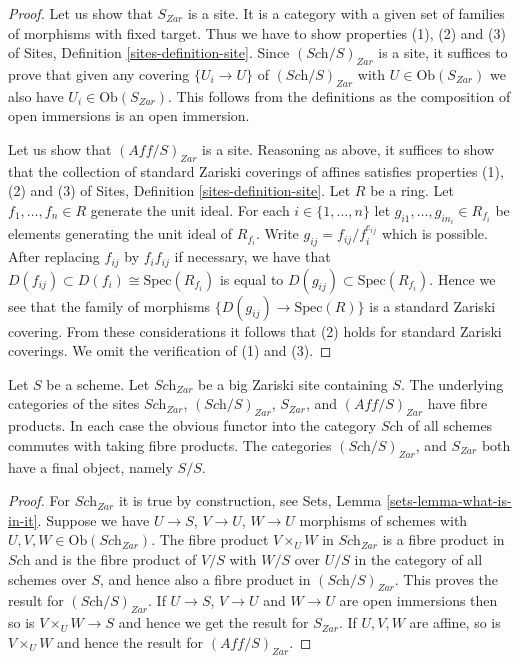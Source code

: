 \begin{proof}
Let us show that $S_{Zar}$ is a site. It is a category with a
given set of families of morphisms with fixed target. Thus we
have to show properties (1), (2) and (3) of
Sites, Definition \ref{sites-definition-site}.
Since $(\textit{Sch}/S)_{Zar}$ is a site, it suffices to prove
that given any covering $\{U_i \to U\}$ of $(\textit{Sch}/S)_{Zar}$
with $U \in \text{Ob}(S_{Zar})$ we also have $U_i \in \text{Ob}(S_{Zar})$.
This follows from the definitions
as the composition of open immersions is an open immersion.

\medskip\noindent
Let us show that $(\textit{Aff}/S)_{Zar}$ is a site.
Reasoning as above, it suffices to show that the collection
of standard Zariski coverings of affines satisfies properties
(1), (2) and (3) of
Sites, Definition \ref{sites-definition-site}.
Let $R$ be a ring. Let $f_1, \ldots, f_n \in R$ generate the unit ideal.
For each $i \in \{1, \ldots, n\}$ let $g_{i1}, \ldots, g_{in_i} \in R_{f_i}$
be elements generating the unit ideal of $R_{f_i}$. Write
$g_{ij} = f_{ij}/f_i^{e_{ij}}$ which is possible. After replacing
$f_{ij}$ by $f_i f_{ij}$ if necessary, we have that
$D(f_{ij}) \subset D(f_i) \cong \text{Spec}(R_{f_i})$ is
equal to $D(g_{ij}) \subset \text{Spec}(R_{f_i})$. Hence we see that
the family of morphisms $\{D(g_{ij}) \to \text{Spec}(R)\}$
is a standard Zariski covering. From these considerations
it follows that (2) holds for standard Zariski coverings.
We omit the verification of (1) and (3).
\end{proof}

\begin{lemma}
\label{lemma-fibre-products-Zariski}
Let $S$ be a scheme. Let $\textit{Sch}_{Zar}$ be a big Zariski
site containing $S$. The underlying categories of the sites
$\textit{Sch}_{Zar}$, $(\textit{Sch}/S)_{Zar}$,
$S_{Zar}$, and $(\textit{Aff}/S)_{Zar}$ have fibre products.
In each case the obvious functor into the category $\textit{Sch}$ of
all schemes commutes with taking fibre products. The categories
$(\textit{Sch}/S)_{Zar}$, and $S_{Zar}$ both have a final object,
namely $S/S$.
\end{lemma}

\begin{proof}
For $\textit{Sch}_{Zar}$ it is true by construction, see
Sets, Lemma \ref{sets-lemma-what-is-in-it}.
Suppose we have $U \to S$, $V \to U$, $W \to U$ morphisms
of schemes with $U, V, W \in \text{Ob}(\textit{Sch}_{Zar})$.
The fibre product $V \times_U W$ in $\textit{Sch}_{Zar}$
is a fibre product in $\textit{Sch}$ and
is the fibre product of $V/S$ with $W/S$ over $U/S$ in
the category of all schemes over $S$, and hence also a
fibre product in $(\textit{Sch}/S)_{Zar}$.
This proves the result for $(\textit{Sch}/S)_{Zar}$.
If $U \to S$, $V \to U$ and $W \to U$ are open immersions then so is
$V \times_U W \to S$ and hence we get the result for $S_{Zar}$.
If $U, V, W$ are affine, so is $V \times_U W$ and hence the
result for $(\textit{Aff}/S)_{Zar}$.
\end{proof}

